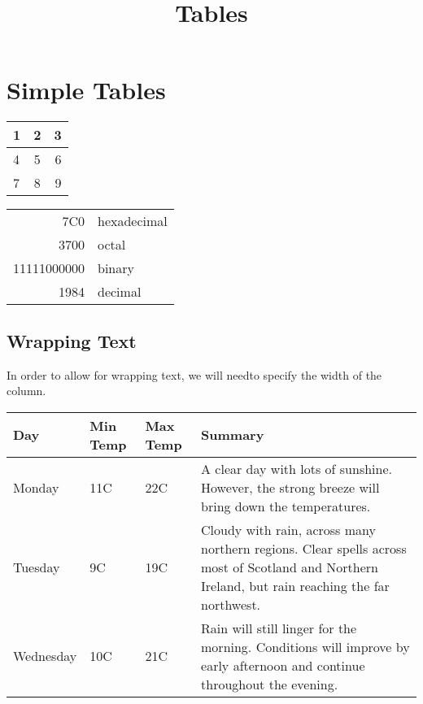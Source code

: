 \documentclass{article}
\title{Tables}
\date{}
\begin{document}
	\maketitle
	\section{Simple Tables}	
	\begin{center}
		\begin{tabular}{ | l | c | r |}
			\hline
			1 & 2 & 3 \\ \hline
			4 & 5 & 6 \\ \hline
			7 & 8 & 9 \\
			\hline
		\end{tabular}
	
	\begin{tabular}{|r|l|}
		\hline
		7C0 & hexadecimal \\
		3700 & octal \\ \cline{2-2}
		11111000000 & binary \\
		\hline \hline
		1984 & decimal \\
		\hline
	\end{tabular}
	\end{center}

	\subsection{Wrapping Text}
	In order to allow for wrapping text, we will needto specify the width of the column. 
	
	\begin{center}
		\begin{tabular}{ | l | l | l | p{5cm} |}
			\hline
			Day & Min Temp & Max Temp & Summary \\ \hline
			Monday & 11C & 22C & A clear day with lots of sunshine.  
			However, the strong breeze will bring down the temperatures. \\ \hline
			Tuesday & 9C & 19C & Cloudy with rain, across many northern regions. Clear spells 
			across most of Scotland and Northern Ireland, 
			but rain reaching the far northwest. \\ \hline
			Wednesday & 10C & 21C & Rain will still linger for the morning. 
			Conditions will improve by early afternoon and continue 
			throughout the evening. \\
			\hline
		\end{tabular}
	\end{center}
	
\end{document}
